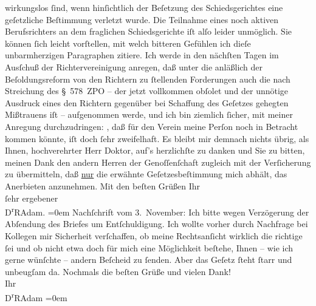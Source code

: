 {\begin{ledgroupsized}[t]{13cm}
                        wirkungs{\pb}los ſind, wenn
                    hinſichtlich der Beſetzung des Schiedsgerichtes eine geſetzliche Beſtimmung
                    verletzt wurde. Die Teilnahme eines noch aktiven Berufsrichters an dem
                    fraglichen Schiedsgerichte iſt alſo leider unmöglich.\pend
           \pstart
           Sie können ſich leicht vorſtellen, mit welch bitteren Gefühlen ich dieſe
                    unbarmherzigen Paragraphen zitiere.\pend
           \pstart
           Ich werde in den nächſten Tagen im Ausſchuß der Richtervereinigung anregen, daß unter die anläßlich der
                    Beſoldungsreform von den Richtern zu ſtellenden Forderungen auch die nach
                    Streichung des § 578 ZPO – der jetzt vollkommen obſolet und der unnötige
                    Ausdruck eines den Richtern gegenüber bei Schaffung des Geſetzes gehegten
                    Mißtrauens iſt – aufgenommen werde, und ich bin ziemlich ſicher, mit meiner
                    Anregung durchzudringen: \label{K_L02357_1v}\label{K_L02357_1h}, daß für den Verein meine Perſon noch in Betracht kommen könnte,
                    iſt doch ſehr zweifelhaft.\pend
           \pstart
           {\pb}Es bleibt mir demnach nichts übrig,
                    als Ihnen, hochverehrter Herr Doktor, auf’s herzlichſte zu danken und Sie zu
                    bitten, meinen Dank den andern Herren der Genoſſenſchaft zugleich mit der Verſicherung zu
                    übermitteln, daß \uline{nur} die erwähnte
                    Geſetzesbeſtimmung mich abhält, das Anerbieten anzunehmen.\pend
           \pstart
           Mit den beſten Grüßen Ihr{\\[\baselineskip]}ſehr ergebener{\\[\baselineskip]}\spacefill\mbox{D\textsuperscript{r}RAdam.}\pend
           \leftskip=0em{}\pstart
           \noindent{}Nachſchrift vom 3. November:\pend
           \pstart
           Ich bitte wegen Verzögerung der Abſendung des Briefes um Entſchuldigung. Ich
                    wollte vorher durch Nachfrage bei Kollegen mir Sicherheit verſchaffen, ob meine
                    Rechtsanſicht wirklich die richtige ſei und ob nicht etwa doch für mich eine
                    Möglichkeit beſtehe, Ihnen – wie ich gerne wünſchte – andern Beſcheid zu ſenden.
                    Aber {\pb}das Geſetz ſteht ſtarr und
                    unbeugſam da.\pend
           \pstart
           Nochmals die beſten Grüße und vielen Dank!{\\[\baselineskip]}Ihr{\\[\baselineskip]}\spacefill\mbox{D\textsuperscript{r}RAdam}\pend
           \leftskip=0em{}
         

\end{ledgroupsized}}
